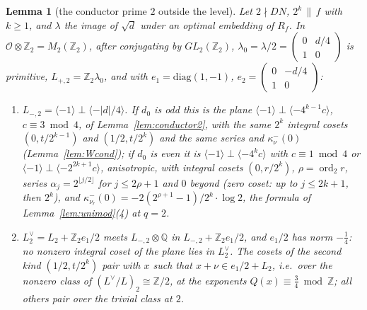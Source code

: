 \documentclass[11pt,reqno]{amsart}
\theoremstyle{plain}
\newtheorem{lemma}[theorem]{Lemma}
\theoremstyle{definition}
\DeclareMathOperator{\ord}{ord}
\newcommand{\Q}{\mathbb{Q}}
\newcommand{\Z}{\mathbb{Z}}
\newcommand{\Ldual}{L^{\vee}}
\begin{document}
\begin{lemma}[the conductor prime $2$ outside the level]\label{lem:unimod2}
Let $2\nmid DN$, $2^k\,\|\,f$ with $k\ge1$, and $\lambda$ the image of $\sqrt d$ under an optimal
embedding of $R_f$. In $\mathcal O\otimes\Z_2=M_2(\Z_2)$, after conjugating by $GL_2(\Z_2)$,
$\lambda_0=\lambda/2=\begin{pmatrix}0&d/4\\1&0\end{pmatrix}$ is primitive, $L_{+,2}=\Z_2\lambda_0$,
and with $e_1=\mathrm{diag}(1,-1)$, $e_2=\begin{pmatrix}0&-d/4\\1&0\end{pmatrix}$:
\begin{enumerate}
\item $L_{-,2}=\langle-1\rangle\perp\langle-\lvert d\rvert/4\rangle$. If $d_0$ is odd this is
      the plane $\langle-1\rangle\perp\langle-4^{k-1}c\rangle$, $c\equiv3\bmod4$, of
      Lemma~\ref{lem:conductor2}, with the same $2^k$ integral cosets $(0,t/2^{k-1})$ and
      $(1/2,t/2^k)$ and the same series and $\kappa^-_\nu(0)$ (Lemma~\ref{lem:Wcond}); if $d_0$ is
      even it is $\langle-1\rangle\perp\langle-4^kc\rangle$ with $c\equiv1\bmod4$ or $\langle-1
      \rangle\perp\langle-2^{2k+1}c\rangle$, anisotropic, with integral cosets $(0,r/2^k)$,
      $\rho=\ord_2r$, series $\alpha_j=2^{\lfloor j/2\rfloor}$ for $j\le2\rho+1$ and $0$ beyond
      (zero coset: up to $j\le2k+1$, then $2^k$), and
      $\kappa^-_{\nu_r}(0)=-2(2^{\rho+1}-1)/2^k\cdot\log2$, the formula of Lemma~\ref{lem:unimod}(4)
      at $q=2$.
\item $L_2^\vee=L_2+\Z_2e_1/2$ meets $L_{-,2}\otimes\Q$ in $L_{-,2}+\Z_2e_1/2$, and $e_1/2$ has
      norm $-\tfrac14$: no nonzero integral coset of the plane lies in $L_2^\vee$. The cosets of the
      second kind $(1/2,t/2^k)$ pair with $x$ such that $x+\nu\in e_1/2+L_2$, i.e.\ over the
      nonzero class of $(\Ldual/L)_2\cong\Z/2$, at the exponents $Q(x)\equiv\tfrac34\bmod\Z$; all
      others pair over the trivial class at $2$.
\end{enumerate}
\end{lemma}
\end{document}
